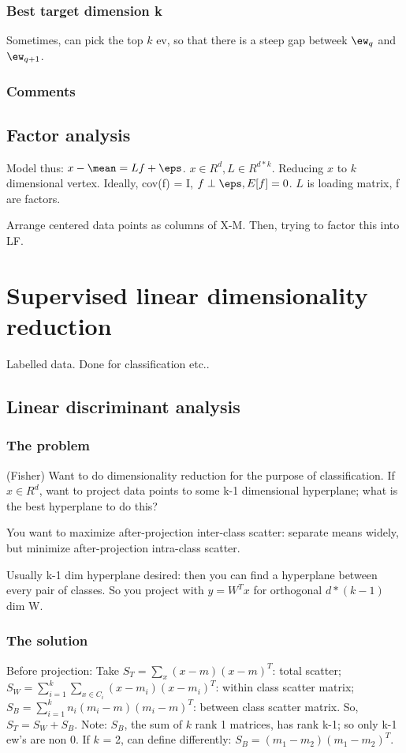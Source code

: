 \documentclass[oneside, article]{memoir}
\begin{document}
\subsubsection{Best target dimension k}
Sometimes, can pick the top $k$ ev, so that there is a steep gap betweek $\ew_q$ and $\ew_{q+1}$.

\subsubsection{Comments}

\subsection{Factor analysis}
Model thus: $x - \mean = Lf + \eps$. $x \in R^{d}, L \in R^{d*k}$. Reducing $x$ to $k$ dimensional vertex. Ideally, cov(f) = I, $f \perp \eps, E[f] = 0$. $L$ is loading matrix, f are factors.

Arrange centered data points as columns of X-M. Then, trying to factor this into LF.

\section{Supervised linear dimensionality reduction}
Labelled data. Done for classification etc..

\subsection{Linear discriminant analysis}
\subsubsection{The problem}
(Fisher) Want to do dimensionality reduction for the purpose of classification. If $x \in R^{d}$, want to project data points to some k-1 dimensional hyperplane; what is the best hyperplane to do this?

You want to maximize after-projection inter-class scatter: separate means widely, but minimize after-projection intra-class scatter.

Usually k-1 dim hyperplane desired: then you can find a hyperplane between every pair of classes. So you project with $y = W^{T}x$ for orthogonal $d*(k-1)$ dim W.

\subsubsection{The solution}
Before projection: Take $S_{T} = \sum_{x}(x - m)(x - m)^{T}$: total scatter; $S_{W} = \sum_{i=1}^{k} \sum_{x \in C_{i}}(x - m_{i})(x - m_{i})^{T}$: within class scatter matrix; $S_{B} = \sum_{i=1}^{k}n_{i}(m_{i}-m)(m_{i}-m)^{T}$: between class scatter matrix. So, $S_{T} = S_{W} + S_{B}$. Note: $S_B$, the sum of $k$ rank 1 matrices, has rank k-1; so only k-1 ew's are non 0. If $k$ = 2, can define differently: $S_B = (m_1 - m_2)(m_1 - m_2)^{T}$.
\end{document}
